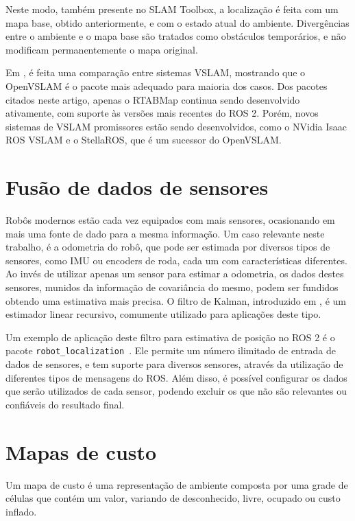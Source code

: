 \documentclass[repeatfields,xlists,xpacks,oneside,yearsonly]{ufrgscca}
\begin{document}
Neste modo, também presente no SLAM Toolbox, a localização é feita
com um mapa base, obtido anteriormente, e com o estado atual do
ambiente. Divergências entre o ambiente e o mapa base são tratados
como obstáculos temporários, e não modificam permanentemente o mapa
original.

Em \textcite{VSLAM}, é feita uma comparação entre sistemas VSLAM,
mostrando que o OpenVSLAM é o pacote mais adequado para maioria dos
casos. Dos pacotes citados neste artigo, apenas o RTABMap continua
sendo desenvolvido ativamente, com suporte às versões mais recentes
do ROS 2. Porém, novos sistemas de VSLAM promissores estão sendo
desenvolvidos, como o NVidia Isaac ROS VSLAM e o StellaROS, que é um
sucessor do OpenVSLAM.

\section{Fusão de dados de sensores}

Robôs modernos estão cada vez equipados com mais sensores,
ocasionando em mais uma fonte de dado para a mesma informação. Um
caso relevante neste trabalho, é a odometria do robô, que pode ser
estimada por diversos tipos de sensores, como IMU ou encoders de
roda, cada um com características diferentes. Ao invés de utilizar
apenas um sensor para estimar a odometria, os dados destes sensores,
munidos da informação de covariância do mesmo, podem ser fundidos
obtendo uma estimativa mais precisa. O filtro de Kalman, introduzido
em \textcite{KalmanFilter}, é um estimador linear recursivo,
comumente utilizado para aplicações deste tipo.

Um exemplo de aplicação deste filtro para estimativa de posição no
ROS 2 é o pacote
\texttt{robot\_localization}~\cite{robot_localization_paper}. Ele
permite um número ilimitado de entrada de dados de sensores, e tem
suporte para diversos sensores, através da utilização de diferentes
tipos de mensagens do ROS. Além disso, é possível configurar os dados
que serão utilizados de cada sensor, podendo excluir os que não são
relevantes ou confiáveis do resultado final.

\section{Mapas de custo}

Um mapa de custo é uma representação de ambiente composta por uma
grade de células que contém um valor, variando de desconhecido,
livre, ocupado ou custo inflado.
\end{document}
